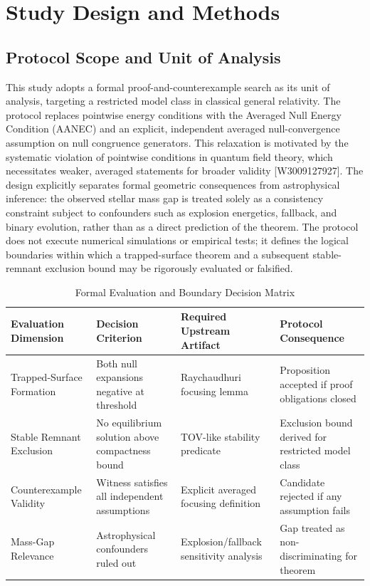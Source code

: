 \documentclass[conference]{IEEEtran}
\begin{document}
\section{Study Design and Methods}
\subsection{Protocol Scope and Unit of Analysis}
This study adopts a formal proof-and-counterexample search as its unit of analysis, targeting a restricted model class in classical general relativity. The protocol replaces pointwise energy conditions with the Averaged Null Energy Condition (AANEC) and an explicit, independent averaged null-convergence assumption on null congruence generators. This relaxation is motivated by the systematic violation of pointwise conditions in quantum field theory, which necessitates weaker, averaged statements for broader validity [W3009127927]. The design explicitly separates formal geometric consequences from astrophysical inference: the observed stellar mass gap is treated solely as a consistency constraint subject to confounders such as explosion energetics, fallback, and binary evolution, rather than as a direct prediction of the theorem. The protocol does not execute numerical simulations or empirical tests; it defines the logical boundaries within which a trapped-surface theorem and a subsequent stable-remnant exclusion bound may be rigorously evaluated or falsified.~\cite{cite_0ed84243cf171bc4}

\begin{table}[htbp]
\centering
\footnotesize
\setlength{\tabcolsep}{3pt}
\renewcommand{\arraystretch}{1.12}
\caption{Formal Evaluation and Boundary Decision Matrix}
\label{tab:study-design-and-methods-decision-matrix}
\begin{tabular}{|p{}|p{}|p{}|p{}|}
\hline
Evaluation Dimension & Decision Criterion & Required Upstream Artifact & Protocol Consequence \\\hline
Trapped-Surface Formation & Both null expansions negative at threshold & Raychaudhuri focusing lemma & Proposition accepted if proof obligations closed \\\hline
Stable Remnant Exclusion & No equilibrium solution above compactness bound & TOV-like stability predicate & Exclusion bound derived for restricted model class \\\hline
Counterexample Validity & Witness satisfies all independent assumptions & Explicit averaged focusing definition & Candidate rejected if any assumption fails \\\hline
Mass-Gap Relevance & Astrophysical confounders ruled out & Explosion/fallback sensitivity analysis & Gap treated as non-discriminating for theorem \\\hline
\end{tabular}
\end{table}
\end{document}
